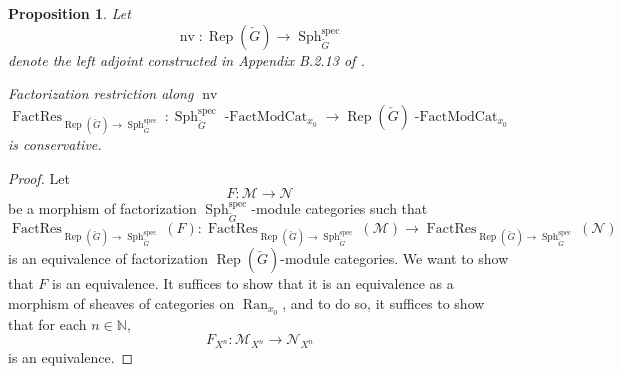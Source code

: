 \documentclass[10pt,a4paper]{amsart}
\newtheorem{prop}[subsubsection]{Proposition}
\newcommand{\on}[1]{\operatorname{#1}}
\newcommand{\Gcheck}{\check{G}}
\newcommand{\Ran}{\on{Ran}}
\begin{document}
\begin{prop}
    Let
    $$
    \on{nv} : \on{Rep}(\Gcheck) \longrightarrow \on{Sph}_{\Gcheck}^{\on{spec}}
    $$
    denote the left adjoint constructed in Appendix B.2.13 of \cite{GLC2}. 
    
    Factorization restriction along $\on{nv}$
    $$
    \on{FactRes}_{\on{Rep}(\Gcheck) \to \on{Sph}_{\Gcheck}^{\on{spec}}} : \on{Sph}_{\Gcheck}^{\on{spec}} \on{-FactModCat}_{x_0} \longrightarrow \on{Rep}(\Gcheck) \on{-FactModCat}_{x_0}
    $$
    is conservative.
\end{prop}
\begin{proof}
    Let 
    $$
    F : \mathcal{M} \longrightarrow \mathcal{N}
    $$
    be a morphism of factorization $\on{Sph}_{\Gcheck}^{\on{spec}}$-module categories such that 
    $$
    \on{FactRes}_{\on{Rep}(\Gcheck) \to \on{Sph}_{\Gcheck}^{\on{spec}}}(F) : \on{FactRes}_{\on{Rep}(\Gcheck) \to \on{Sph}_{\Gcheck}^{\on{spec}}}(\mathcal{M}) \longrightarrow \on{FactRes}_{\on{Rep}(\Gcheck) \to \on{Sph}_{\Gcheck}^{\on{spec}}} (\mathcal{N})
    $$
    is an equivalence of factorization $\on{Rep}(\Gcheck)$-module categories.
    We want to show that $F$ is an equivalence. It suffices to show that it is an equivalence as a morphism of sheaves of categories on $\Ran_{x_0}$, and to do so, it suffices to show that for each $n \in \mathbb{N}$,
    $$
    F_{X^n} : \mathcal{M}_{X^n} \longrightarrow \mathcal{N}_{X^n}
    $$
    is an equivalence.
    

\end{proof}
\end{document}
